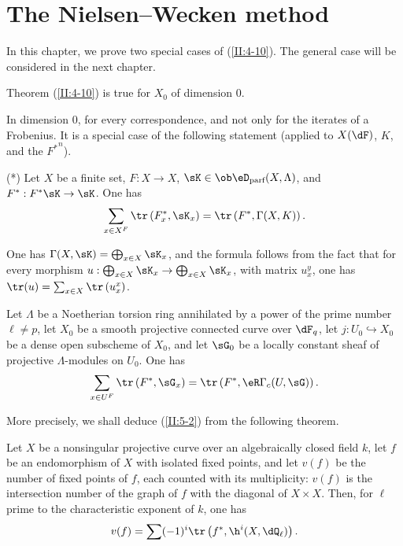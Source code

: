 \section{The Nielsen--Wecken method}\label{II:5}

In this chapter, we prove two special cases of (\ref{II:4-10}). The general
case will be considered in the next chapter.






\begin{lemma_}\label{II:5-1}
Theorem (\ref{II:4-10}) is true for $X_0$ of dimension $0$.
\end{lemma_}

In dimension $0$,  for every correspondence,
and not only for the iterates of a Frobenius. It is a special case of the
following statement (applied to $X(\dF)$, $K$, and the ${F^*}^n$).

(*) Let $X$ be a finite set, $F:X\to X$,
$\sK\in\ob\eD_\text{parf}(X,\Lambda)$, and $F^*:F^* \sK\to \sK$. One has
\[
  \sum_{x\in X^F} \tr\left(F_x^*,\sK_x\right) = \tr\left(F^*,\Gamma(X,K)\right) \text{.}
\]

One has $\Gamma(X,\sK)=\bigoplus_{x\in X} \sK_x$, and the formula follows
from the fact that for every morphism
$u:\bigoplus_{x\in X} \sK_x\to \bigoplus_{x\in X} \sK_x$, with matrix
$u_x^y$, one has $\tr(u)=\sum_{x\in X} \tr\left(u_x^x\right)$.






\begin{lemma_}\label{II:5-2}
Let $\Lambda$ be a Noetherian torsion ring annihilated by a power of the prime
number $\ell\ne p$, let $X_0$ be a smooth projective connected curve over
$\dF_q$, let $j:U_0\hookrightarrow X_0$ be a dense open subscheme of $X_0$,
and let $\sG_0$ be a locally constant sheaf of projective
$\Lambda$-modules on $U_0$. One has
\[
  \sum_{x\in U^F} \tr\left(F^*,\sG_x\right) = \tr\left(F^*,\eR\Gamma_c(U,\sG)\right) \text{.}
\]
\end{lemma_}

More precisely, we shall deduce (\ref{II:5-2}) from the following theorem.






\begin{theorem_}\label{II:5-3}
Let $X$ be a nonsingular projective curve over an algebraically closed field
$k$, let $f$ be an endomorphism of $X$ with isolated fixed points, and let
$v(f)$ be the number of fixed points of $f$, each counted with its
multiplicity: $v(f)$ is the intersection number of the graph of $f$ with the
diagonal of $X\times X$. Then, for $\ell$ prime to the characteristic
exponent of $k$, one has
\[
  v(f) = \sum (-1)^i \tr\left(f^*,\h^i(X,\dQ_\ell)\right) \text{.}
\]
\end{theorem_}

